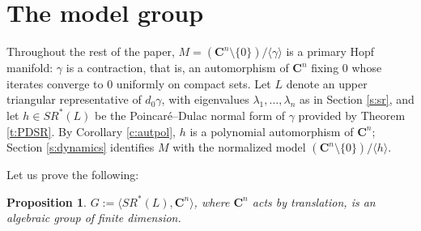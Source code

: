 \documentclass[english,11pt]{amsart}
\newtheorem{proposition}[theorem]{Proposition}
\theoremstyle{definition}
\theoremstyle{remark}
\numberwithin{equation}{section}
\newcommand{\C}{\mathbf{C}}
\begin{document}
\section{The model group}\label{s:model}

Throughout the rest of the paper, $M=(\C^n\setminus\{0\})/\langle\gamma\rangle$ is a primary Hopf manifold: $\gamma$ is a contraction, that is, an automorphism of $\C^n$ fixing $0$ whose iterates converge to $0$ uniformly on compact sets. Let $L$ denote an upper triangular representative of $d_0\gamma$, with eigenvalues $\lambda_1,\dots,\lambda_n$ as in Section \ref{s:sr}, and let $h\in SR^*(L)$ be the Poincar\'e--Dulac normal form of $\gamma$ provided by Theorem \ref{t:PDSR}. By Corollary \ref{c:autpol}, $h$ is a polynomial automorphism of $\C^n$; Section \ref{s:dynamics} identifies $M$ with the normalized model $(\C^n\setminus\{0\})/\langle h\rangle$.

Let us prove the following:

\begin{proposition}\label{p:Ggroup}
$G := \langle SR^*(L), \C^n \rangle$, where $\C^n$ acts by translation, is an algebraic group of finite dimension.
\end{proposition}
\end{document}
